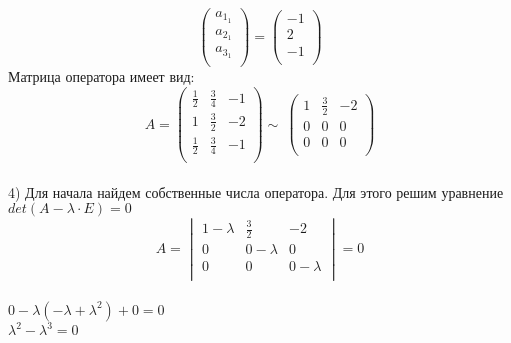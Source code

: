 \documentclass{article}
\begin{document}
    \\
    \begin{equation*}
        \begin{pmatrix}
            a_1_1\\
            a_2_1\\
            a_3_1\\
        \end{pmatrix}
        =
        \begin{pmatrix}
            -1\\
            2\\
            -1\\
        \end{pmatrix}
    \end{equation*}
    Матрица оператора имеет вид:
    \\
    \begin{equation*}
        A =
        \begin{pmatrix}
            \frac{1}{2}& \frac{3}{4}& -1\\
            1& \frac{3}{2}& -2\\
            \frac{1}{2}& \frac{3}{4}& -1\\    
        \end{pmatrix}
        \sim{~}
        \begin{pmatrix}
            1& \frac{3}{2}& -2\\
            0& 0& 0\\
            0& 0& 0\\
        \end{pmatrix}
    \end{equation*}
    \\
    4) Для начала найдем собственные числа оператора. Для этого решим
    уравнение $det(A - \lambda  \cdot  E)=0$
    \\
    \begin{equation*}
        A =
        \begin{vmatrix}
            1 - \lambda & \frac{3}{2}& -2\\
            0& 0-\lambda& 0\\
            0& 0& 0-\lambda\\    
        \end{vmatrix}
        = 0
    \end{equation*}
    \\
    $ 0 - \lambda(- \lambda + \lambda^2) + 0 = 0$\\
    $\lambda ^ 2 - \lambda ^ 3 = 0$\\
\end{document}

